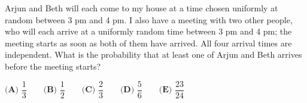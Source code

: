 Arjun and Beth will each come to my house at a time chosen uniformly at random between 3 pm and 4 pm. I also have a meeting with two other people, who will each arrive at a uniformly random time between 3 pm and 4 pm; the meeting starts as soon as both of them have arrived. All four arrival times are independent. What is the probability that at least one of Arjun and Beth arrives before the meeting starts?

$\textbf{(A) }\dfrac13\qquad\textbf{(B) }\dfrac12\qquad\textbf{(C) }\dfrac23\qquad\textbf{(D) }\dfrac56\qquad\textbf{(E) }\dfrac{23}{24}$
